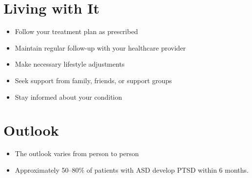 \section{Living with It}
\begin{itemize}[noitemsep]
  \item Follow your treatment plan as prescribed
  \item Maintain regular follow-up with your healthcare provider
  \item Make necessary lifestyle adjustments
  \item Seek support from family, friends, or support groups
  \item Stay informed about your condition
\end{itemize}
\section{Outlook}
\begin{itemize}[noitemsep]
  \item The outlook varies from person to person
  \item Approximately 50--80\% of patients with ASD develop PTSD within 6 months.
\end{itemize}
